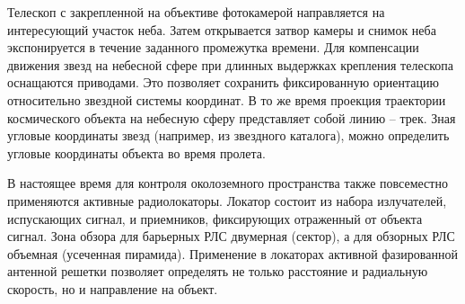 Телескоп с закрепленной на объективе фотокамерой направляется на интересующий участок неба.
Затем открывается затвор камеры и снимок неба экспонируется в течение заданного промежутка времени.
Для компенсации движения звезд на небесной сфере при длинных выдержках крепления телескопа
оснащаются приводами. Это позволяет сохранить фиксированную ориентацию относительно звездной системы координат.
В то же время проекция траектории космического объекта на небесную сферу представляет собой линию -- трек.
Зная угловые координаты звезд (например, из звездного каталога), можно определить угловые координаты объекта во время пролета.

В настоящее время для контроля околоземного пространства также повсеместно применяются активные радиолокаторы.
Локатор состоит из набора излучателей, испускающих сигнал, и приемников, фиксирующих отраженный от объекта сигнал.
Зона обзора для барьерных РЛС двумерная (сектор), а для обзорных РЛС объемная (усеченная пирамида).
Применение в локаторах активной фазированной антенной решетки позволяет определять не только расстояние и 
радиальную скорость, но и направление на объект.